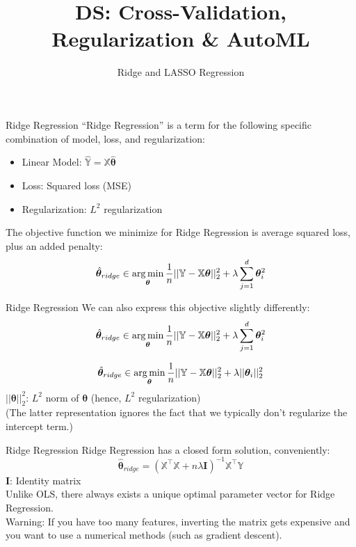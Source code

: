 \documentclass[aspectratio=169]{../latex_main/tntbeamer}  %
\title[CV, Reg \& AutoML]{DS: Cross-Validation, Regularization \& AutoML}
\subtitle{Ridge and LASSO Regression}
\begin{document}
	
	\maketitle
	\begin{frame}{Ridge Regression}
	    “Ridge Regression” is a term for the following specific combination of model, loss, and regularization:
	    \begin{itemize}
	        \item Linear Model: $\mathbb{\hat{Y}} = \mathbb{X}\hat{\bm\theta}$
	        \item Loss: Squared loss (MSE)
	        \item Regularization: $L^2$ regularization
	    \end{itemize}
	    The objective function we minimize for Ridge Regression is average squared loss, plus an added penalty:
	    \begin{equation*}
	        \hat{\bm{\theta}}_{ridge} \in \operatorname*{arg\,min}_{\bm\theta}\frac{1}{n}||\mathbb{Y} - \mathbb{X}\bm{\theta}||_2^2 + \lambda \sum_{j=1}^d\bm{\theta}_i^2 
	    \end{equation*}
	\end{frame}
	
	
	\begin{frame}{Ridge Regression}
	    We can also express this objective slightly differently:
	    \begin{equation*}
	        \hat{\bm{\theta}}_{ridge} \in \operatorname*{arg\,min}_{\bm\theta}\frac{1}{n}||\mathbb{Y} - \mathbb{X}\bm{\theta}||_2^2 + \lambda \sum_{j=1}^d\bm{\theta}_i^2 
	    \end{equation*}
	    
	    \begin{equation*}
	    	        \hat{\bm{\theta}}_{ridge} \in \argmin_{\bm\theta}\frac{1}{n}||\mathbb{Y} - \mathbb{X}\bm{\theta}||_2^2 + \lambda ||\bm{\theta}_i||^2_2 
	        
	    \end{equation*}
	    $||\bm{\theta} ||^2_2$: $L^2$ norm of $\bm\theta$ (hence, $L^2$ regularization)\\
	    \bigskip
	    (The latter representation ignores the fact that we typically don’t regularize the intercept term.)
	\end{frame}
	
	
	\begin{frame}[c]{Ridge Regression}
	    Ridge Regression has a closed form solution, conveniently:
	    \begin{equation*}
	        \hat{\bm\theta}_{ridge} = (\mathbb{X}^\intercal\mathbb{X} + n\lambda \bm{I})^{-1} \mathbb{X}^\intercal\mathbb{Y}
	    \end{equation*}
	   $\bm{I}$: Identity matrix\\[1em]
	    Unlike OLS, there always exists a unique optimal parameter vector for Ridge Regression.\\[1em]
	    
	    \alert{Warning}: If you have too many features, inverting the matrix gets expensive and you want to use a numerical methods (such as gradient descent).

	\end{frame}
	
\end{document}
